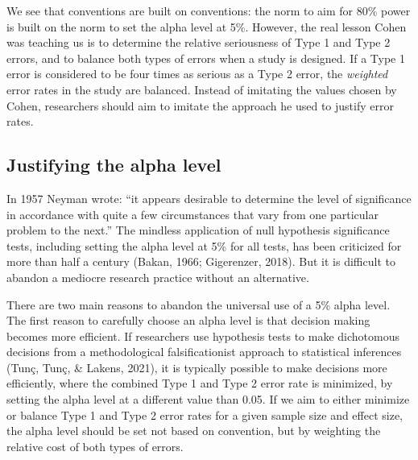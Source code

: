 \documentclass[
  english,
  ,jou, a4paper,floatsintext]{apa6}
\begin{document}
We see that conventions are built on conventions: the norm to aim for 80\% power is built on the norm to set the alpha level at 5\%. However, the real lesson Cohen was teaching us is to determine the relative seriousness of Type 1 and Type 2 errors, and to balance both types of errors when a study is designed. If a Type 1 error is considered to be four times as serious as a Type 2 error, the \emph{weighted} error rates in the study are balanced. Instead of imitating the values chosen by Cohen, researchers should aim to imitate the approach he used to justify error rates.

\hypertarget{justifying-the-alpha-level}{%
\subsection{Justifying the alpha level}\label{justifying-the-alpha-level}}

In 1957 Neyman wrote: ``it appears desirable to determine the level of significance in accordance with quite a few circumstances that vary from one particular problem to the next.'' The mindless application of null hypothesis significance tests, including setting the alpha level at 5\% for all tests, has been criticized for more than half a century (Bakan, 1966; Gigerenzer, 2018). But it is difficult to abandon a mediocre research practice without an alternative.

There are two main reasons to abandon the universal use of a 5\% alpha level. The first reason to carefully choose an alpha level is that decision making becomes more efficient. If researchers use hypothesis tests to make dichotomous decisions from a methodological falsificationist approach to statistical inferences (Tunç, Tunç, \& Lakens, 2021), it is typically possible to make decisions more efficiently, where the combined Type 1 and Type 2 error rate is minimized, by setting the alpha level at a different value than 0.05. If we aim to either minimize or balance Type 1 and Type 2 error rates for a given sample size and effect size, the alpha level should be set not based on convention, but by weighting the relative cost of both types of errors.
\end{document}
